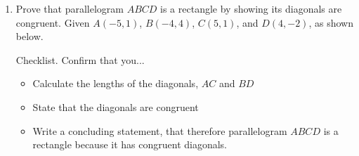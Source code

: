\documentclass[12pt, twoside]{article}
\begin{document}
\begin{enumerate}
\newpage
  \item Prove that parallelogram $ABCD$ is a rectangle by showing its diagonals are congruent. Given $A(-5,1)$, $B(-4,4)$, $C(5,1)$, and $D(4,-2)$, as shown below.
    \begin{multicols}{2}
      Checklist. Confirm that you...
      \begin{itemize}
        \item Calculate the lengths of the diagonals, $AC$ and $BD$
        \item State that the diagonals are congruent
        \item Write a concluding statement, that therefore parallelogram $ABCD$ is a rectangle because it has congruent diagonals.
      \end{itemize}
    \end{multicols}


\end{enumerate}
\newpage
\setcounter{page}{1}
\end{document}
